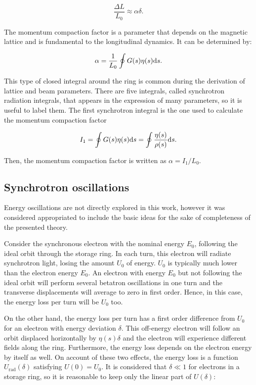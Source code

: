 \begin{equation}
    \frac{\Delta L}{L_0} \approx \alpha \delta.
    \label{orbitlen}
\end{equation}

The momentum compaction factor is a parameter that depends on the magnetic lattice and is fundamental to the longitudinal dynamics. It can be determined by:

\begin{equation}
    \alpha = \dfrac{1}{L_0}\oint G(s) \eta(s) \mathrm{d} s.
\end{equation}

This type of closed integral around the ring is common during the derivation of lattice and beam parameters. There are five integrals, called synchrotron radiation integrals, that appears in the expression of many parameters, so it is useful to label them. The first synchrotron integral is the one used to calculate the momentum compaction factor

\begin{equation}
    I_1 = \oint G(s) \eta(s) \mathrm{d} s = \oint \dfrac{\eta(s)}{\rho(s)} \mathrm{d} s.
\end{equation}

Then, the momentum compaction factor is written as $\alpha = I_1/L_0$.

\subsection{Synchrotron oscillations}

Energy oscillations are not directly explored in this work, however it was considered appropriated to include the basic ideas for the sake of completeness of the presented theory.

Consider the synchronous electron with the nominal energy $E_0$, following the ideal orbit through the storage ring. In each turn, this electron will radiate synchrotron light, losing the amount $U_0$ of energy. $U_0$ is typically much lower than the electron energy $E_0$. An electron with energy $E_0$ but not following the ideal orbit will perform several betatron oscillations in one turn and the transverse displacements will average to zero in first order. Hence, in this case, the energy loss per turn will be $U_0$ too. 

On the other hand, the energy loss per turn has a first order difference from $U_0$ for an electron with energy deviation $\delta$. This off-energy electron will follow an orbit displaced horizontally by $\eta(s)\delta$ and the electron will experience different fields along the ring. Furthermore, the energy loss depends on the electron energy by itself as well. On account of these two effects, the energy loss is a function $U_{\mathrm{rad}}(\delta)$ satisfying $U(0) = U_0$. It is considered that $\delta \ll 1$ for electrons in a storage ring, so it is reasonable to keep only the linear part of $U(\delta)$:

